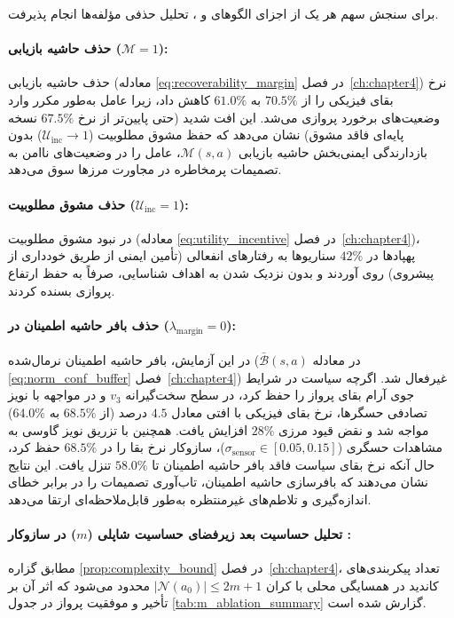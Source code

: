 \documentclass[oneside,openany,phd]{TMU-Thesis}
\begin{document}
برای سنجش سهم هر یک از اجزای الگوهای \sgos و \caepv، تحلیل حذفی مؤلفه‌ها انجام پذیرفت.

\paragraph{حذف حاشیه بازیابی ($\mathcal{M} = 1$):} حذف حاشیه بازیابی (معادله \ref{eq:recoverability_margin} در فصل~\ref{ch:chapter4}) نرخ بقای فیزیکی را از $70.5\%$ به $61.0\%$ کاهش داد، زیرا عامل به‌طور مکرر وارد وضعیت‌های برخورد پروازی می‌شد. این افت شدید (حتی پایین‌تر از نرخ $67.5\%$ نسخه پایه‌ای فاقد مشوق) نشان می‌دهد که حفظ مشوق مطلوبیت ($\mathcal{U}_{\text{inc}} \to 1$) بدون بازدارندگی ایمنی‌بخش حاشیه بازیابی $\mathcal{M}(s, a)$، عامل را در وضعیت‌های ناامن به تصمیمات پرمخاطره در مجاورت مرزها سوق می‌دهد.

\paragraph{حذف مشوق مطلوبیت ($\mathcal{U}_{\text{inc}} = 1$):} در نبود مشوق مطلوبیت (معادله \ref{eq:utility_incentive} در فصل~\ref{ch:chapter4})، پهپادها در $42\%$ سناریوها به رفتارهای انفعالی (تأمین ایمنی از طریق خودداری از پیشروی) روی آوردند و بدون نزدیک شدن به اهداف شناسایی، صرفاً به حفظ ارتفاع پروازی بسنده کردند.

\paragraph{حذف بافر حاشیه اطمینان در \cmrsdrl ($\lambda_{\text{margin}} = 0$):} در این آزمایش، بافر حاشیه اطمینان نرمال‌شده ($\bar{\mathcal{B}}(s, a)$ در معادله \ref{eq:norm_conf_buffer} فصل~\ref{ch:chapter4}) غیرفعال شد. اگرچه سیاست در شرایط جوی آرام بقای پرواز را حفظ کرد، در سطح سخت‌گیرانه $v_3$ و در مواجهه با نویز تصادفی حسگرها، نرخ بقای فیزیکی با افتی معادل $4.5$ درصد (از $68.5\%$ به $64.0\%$) مواجه شد و نقض قیود مرزی $28\%$ افزایش یافت. همچنین با تزریق نویز گاوسی به مشاهدات حسگری ($\sigma_{\text{sensor}} \in [0.05, 0.15]$)، سازوکار \cmrsdrl نرخ بقا را در $68.5\%$ حفظ کرد، حال آنکه نرخ بقای سیاست فاقد بافر حاشیه اطمینان تا $58.0\%$ تنزل یافت. این نتایج نشان می‌دهند که بافرسازی حاشیه اطمینان، تاب‌آوری تصمیمات را در برابر خطای اندازه‌گیری و تلاطم‌های غیرمنتظره به‌طور قابل‌ملاحظه‌ای ارتقا می‌دهد.

\paragraph{تحلیل حساسیت بعد زیرفضای حساسیت شاپلی ($m$) در سازوکار \pgalr:} مطابق گزاره \ref{prop:complexity_bound} در فصل~\ref{ch:chapter4}، تعداد پیکربندی‌های کاندید در همسایگی محلی با کران $|\mathcal{N}(a_0)| \le 2m + 1$ محدود می‌شود که اثر آن بر تأخیر و موفقیت پرواز در جدول \ref{tab:m_ablation_summary} گزارش شده است.
\end{document}
